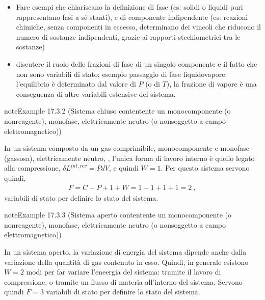 \documentclass[letterpaper,10pt,italian]{jupyterBook}
\begin{document}
\sphinxAtStartPar
{}
\begin{itemize}
\item {} 
\sphinxAtStartPar
Fare esempi che chiariscano la definizione di fase (es: solidi o liquidi puri rappresentano fasi a sé stanti), e di componente indipendente (es: reazioni chimiche, senza componenti in eccesso, determinano dei vincoli che riducono il numero di sostanze indipendenti, grazie ai rapporti stechiometrici tra le sostanze)

\item {} 
\sphinxAtStartPar
discutere il ruolo delle frazioni di fase di un singolo componente e il fatto che non sono variabili di stato; esempio passaggio di fase liquido\sphinxhyphen{}vapore: l’equilibrio è determinato dal valore di \(P\) (o di \(T\)), la frazione di vapore è una conseguenza di altre variabili estensive del sistema.

\end{itemize}
\label{ch/thermodynamics/principles-gibbs-phase-rule:example-5}
\begin{sphinxadmonition}{note}{Example 17.3.2 (Sistema chiuso contentente un monocomponente (o non\sphinxhyphen{}reagente), monofase, elettricamente neutro (o non\sphinxhyphen{}soggetto a campo elettromagnetico))}



\sphinxAtStartPar
In un sistema composto da un gas comprimibile, monocomponente e monofase (gassosa), elettricamente neutro,  , l’unica forma di lavoro interno è quello legato alla compressione, \(\delta L^{int,rev} = P dV\), e quindi \(W = 1\). Per questo sistema servono quindi,
\begin{equation*}
\begin{split}F = C - P + 1 + W = 1 - 1 + 1 + 1 = 2 \ ,\end{split}
\end{equation*}
\sphinxAtStartPar
variabili di stato per definire lo stato del sistema.
\end{sphinxadmonition}
\label{ch/thermodynamics/principles-gibbs-phase-rule:example-6}
\begin{sphinxadmonition}{note}{Example 17.3.3 (Sistema aperto contentente un monocomponente (o non\sphinxhyphen{}reagente), monofase, elettricamente neutro (o non\sphinxhyphen{}soggetto a campo elettromagnetico))}



\sphinxAtStartPar
In un sistema aperto, la variazione di energia del sistema dipende anche dalla variazione della quantità di gas contenuto in esso. Quindi, in generale esistono \(W = 2\) modi per far variare l’eneergia del sistema: tramite il lavoro di compressione, o tramite un flusso di materia all’interno del sistema. Servono quindi \(F=3\) variabili di stato per definire lo stato del sistema.
\end{sphinxadmonition}
\end{document}
